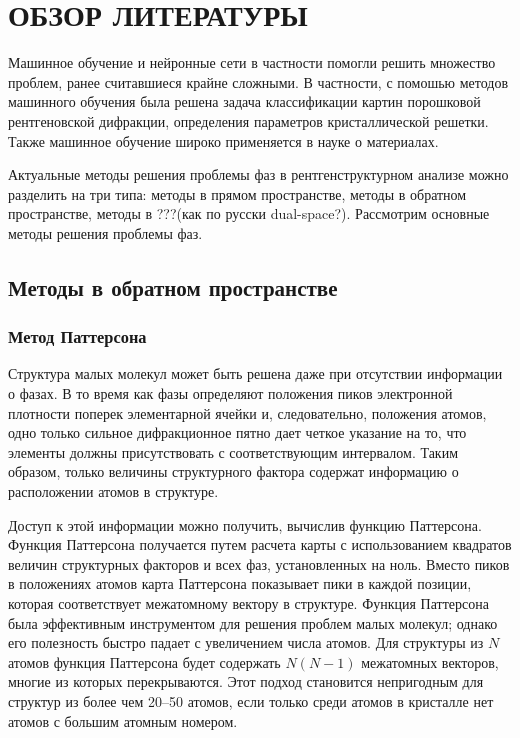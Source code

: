 \documentclass{article}
\begin{document}
\section{ОБЗОР ЛИТЕРАТУРЫ}

Машинное обучение и нейронные сети в частности помогли решить множество проблем, ранее считавшиеся крайне сложными. В частности, с помошью методов машинного обучения была решена \cite{XRD-NN} задача классификации картин порошковой рентгеновской дифракции, определения параметров кристаллической решетки\cite{MCMC}. Также машинное обучение широко применяется в науке о материалах\cite{ML-mat}.

Актуальные методы решения проблемы фаз в рентгенструктурном анализе можно разделить на три типа: методы в прямом пространстве, методы в обратном пространстве, методы в ???(как по русски dual-space?)\cite{XR-ED}. Рассмотрим основные методы решения проблемы фаз.
\subsection{Методы в обратном пространстве}
\subsubsection{Метод Паттерсона}

Структура малых молекул может быть решена даже при отсутствии информации о фазах. В то время как фазы определяют положения пиков электронной плотности поперек элементарной ячейки и, следовательно, положения атомов, одно только сильное дифракционное пятно дает четкое указание на то, что элементы должны присутствовать с соответствующим интервалом. Таким образом, только величины структурного фактора содержат информацию о расположении атомов в структуре.

Доступ к этой информации можно получить, вычислив функцию Паттерсона\cite{PattersonMethod}. Функция Паттерсона получается путем расчета карты с использованием квадратов величин структурных факторов и всех фаз, установленных на ноль. Вместо пиков в положениях атомов карта Паттерсона показывает пики в каждой позиции, которая соответствует межатомному вектору в структуре. Функция Паттерсона была эффективным инструментом для решения проблем малых молекул; однако его полезность быстро падает с увеличением числа атомов. Для структуры из $N$ атомов функция Паттерсона будет содержать $N (N - 1)$ межатомных векторов, многие из которых перекрываются. Этот подход становится непригодным для структур из более чем 20–50 атомов, если только среди атомов в кристалле нет атомов с большим атомным номером.
\end{document}
